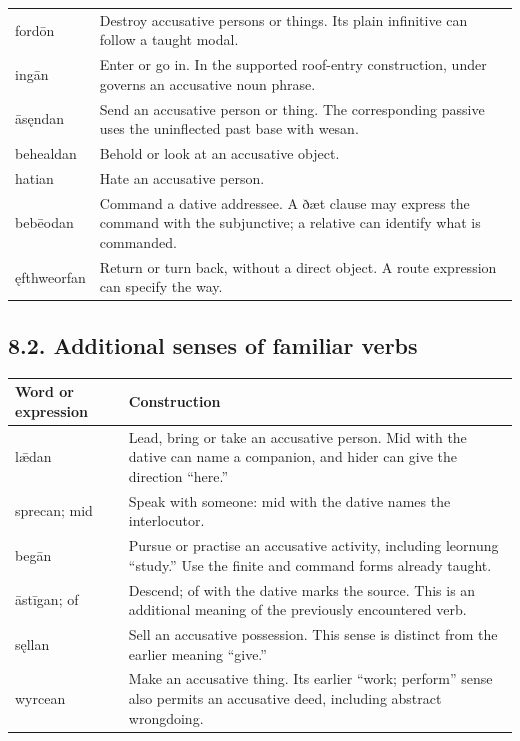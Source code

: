 \begin{longtable}{@{}>{\raggedright\arraybackslash}p{21.67mm}>{\raggedright\arraybackslash}p{99.52mm}@{}}
fordōn & Destroy accusative persons or things. Its plain infinitive can follow a taught modal. \\
ingān & Enter or go in. In the supported roof-entry construction, under governs an accusative noun phrase. \\
āsęndan & Send an accusative person or thing. The corresponding passive uses the uninflected past base with wesan. \\
behealdan & Behold or look at an accusative object. \\
hatian & Hate an accusative person. \\
bebēodan & Command a dative addressee. A ðæt clause may express the command with the subjunctive; a relative can identify what is commanded. \\
ęfthweorfan & Return or turn back, without a direct object. A route expression can specify the way. \\
\end{longtable}
\par\endgroup

\subsection*{8.2. Additional senses of familiar verbs}

\par\begingroup
\fontsize{10.5}{13.2}\selectfont
\setlength{\LTleft}{0pt}\setlength{\LTright}{\fill}
\noindent
\begin{tabular}{@{}>{\raggedright\arraybackslash}p{21.53mm}>{\raggedright\arraybackslash}p{99.66mm}@{}}
\toprule
\textbf{Word or expression} & \textbf{Construction} \\
\midrule
lǣdan & Lead, bring or take an accusative person. Mid with the dative can name a companion, and hider can give the direction “here.” \\
sprecan; mid & Speak with someone: mid with the dative names the interlocutor. \\
begān & Pursue or practise an accusative activity, including leornung “study.” Use the finite and command forms already taught. \\
āstīgan; of & Descend; of with the dative marks the source. This is an additional meaning of the previously encountered verb. \\
sęllan & Sell an accusative possession. This sense is distinct from the earlier meaning “give.” \\
wyrcean & Make an accusative thing. Its earlier “work; perform” sense also permits an accusative deed, including abstract wrongdoing. \\
\bottomrule
\end{tabular}
\par\endgroup

